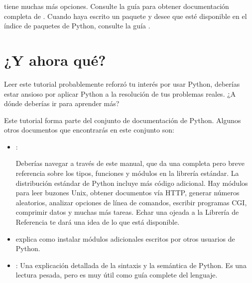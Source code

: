 \documentclass[a5paper,10pt,spanish]{sphinxmanual}
\begin{document}
\sphinxAtStartPar
{} tiene muchas más opciones.  Consulte la guía  para obtener documentación completa de .  Cuando haya escrito un paquete y desee que esté disponible en el índice de paquetes de Python, consulte la guía .


\chapter{¿Y ahora qué?}
\label{\detokenize{tutorial/whatnow:what-now}}\label{\detokenize{tutorial/whatnow:tut-whatnow}}\label{\detokenize{tutorial/whatnow::doc}}
\sphinxAtStartPar
Leer este tutorial probablemente reforzó tu interés por usar Python, deberías estar ansioso por aplicar Python a la resolución de tus problemas reales. ¿A dónde deberías ir para aprender más?

\sphinxAtStartPar
Este tutorial forma parte del conjunto de documentación de Python. Algunos otros documentos que encontrarás en este conjunto son:
\begin{itemize}
\item {} 
\sphinxAtStartPar
{}:

\sphinxAtStartPar
Deberías navegar a través de este manual, que da una completa pero breve referencia sobre los tipos, funciones y módulos en la librería estándar. La distribución estándar de Python incluye  más código adicional. Hay módulos para leer  buzones Unix,  obtener documentos vía HTTP,  generar números aleatorios, analizar opciones de línea de comandos, escribir programas CGI, comprimir datos y muchas más tareas. Echar una ojeada a la Librería de Referencia te dará una idea de lo que está disponible.

\item {} 
\sphinxAtStartPar
{}  explica como instalar módulos adicionales escritos por otros usuarios de Python.

\item {} 
\sphinxAtStartPar
{}: Una explicación detallada de la sintaxis y la semántica de Python. Es una lectura pesada, pero es muy útil como guía complete del lenguaje.

\end{itemize}
\end{document}
